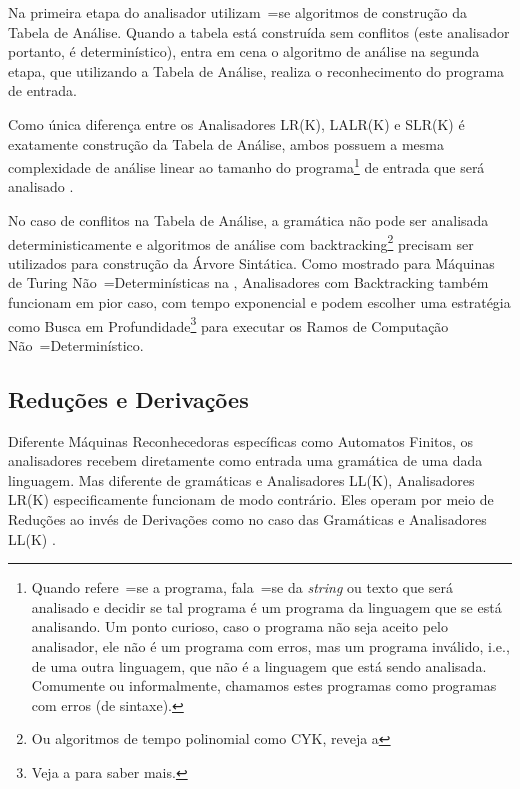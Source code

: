Na primeira etapa do analisador utilizam~=se algoritmos de construção da Tabela de Análise.
Quando a tabela está construída sem conflitos (este analisador portanto,
é determinístico),
entra em cena o algoritmo de análise na segunda etapa,
que utilizando a Tabela de Análise,
realiza o reconhecimento do programa de entrada.

Como única diferença entre os Analisadores LR(K),
LALR(K) e
SLR(K) é exatamente construção da Tabela de Análise,
ambos possuem a mesma complexidade de análise linear ao tamanho do programa\footnote{
Quando refere~=se a programa,
fala~=se da \textit{string} ou
texto que será analisado e
decidir se tal programa é um programa da linguagem que se está analisando.
Um ponto curioso,
caso o programa não seja aceito pelo analisador,
ele não é um programa com erros,
mas um programa inválido,
i.e.,
de uma outra linguagem,
que não é a linguagem que está sendo analisada.
Comumente ou
informalmente,
chamamos estes programas como programas com erros (de sintaxe).
}
de entrada que será analisado \cite{knuthLrParser1965,linearLL1AndLR1Grammars,generalContextFreeParsingAlgorithm}.

No caso de conflitos na Tabela de Análise,
a gramática não pode ser analisada deterministicamente e
algoritmos de análise com backtracking\footnote{
Ou algoritmos de tempo polinomial como CYK,
reveja a 
}
precisam ser utilizados para construção da Árvore Sintática.
Como mostrado para Máquinas de Turing Não~=Determinísticas na ,
Analisadores com Backtracking também funcionam em pior caso,
com tempo exponencial e
podem escolher uma estratégia como Busca em Profundidade\footnote{
Veja a  para saber mais.
} para executar os Ramos de Computação Não~=Determinístico.


\subsection{Reduções e Derivações}
\label{reducoesEderivacoes}

Diferente Máquinas Reconhecedoras específicas como Automatos Finitos,
os analisadores recebem diretamente como entrada uma gramática de uma dada linguagem.
Mas diferente de gramáticas e
Analisadores LL(K),
Analisadores LR(K) especificamente funcionam de modo contrário.
Eles operam por meio de Reduções ao invés de Derivações como no caso das Gramáticas e
Analisadores LL(K) \cite{ahoCompilerDragonBook}.

